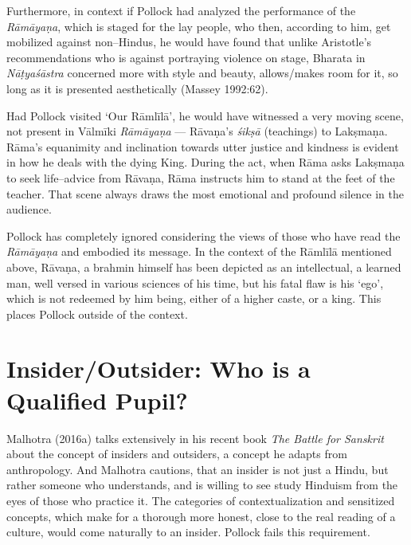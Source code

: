 Furthermore, in context if Pollock had analyzed the performance of the \textit{Rāmāyaṇa}, which is staged for the lay people, who then, according to him, get mobilized against non–Hindus, he would have found that unlike Aristotle’s recommendations who is against portraying violence on stage, Bharata in \textit{Nāṭyaśāstra} concerned more with style and beauty, allows/makes room for it, so long as it is presented aesthetically (Massey 1992:62).

Had Pollock visited ‘Our Rāmlīlā’, he would have witnessed a very moving scene, not present in Vālmīki \textit{Rāmāyaṇa} — Rāvaṇa’s \textit{śikṣā} (teachings) to Lakṣmaṇa. Rāma’s equanimity and inclination towards utter justice and kindness is evident in how he deals with the dying King. During the act, when Rāma asks Lakṣmaṇa to seek life–advice from Rāvaṇa, Rāma instructs him to stand at the feet of the teacher. That scene always draws the most emotional and profound silence in the audience.

Pollock has completely ignored considering the views of those who have read the \textit{Rāmāyaṇa} and embodied its message. In the context of the Rāmlīlā mentioned above, Rāvaṇa, a brahmin himself has been depicted as an intellectual, a learned man, well versed in various sciences of his time, but his fatal flaw is his ‘ego’, which is not redeemed by him being, either of a higher caste, or a king. This places Pollock outside of the context.


\section*{Insider/Outsider: Who is a Qualified Pupil?}

Malhotra (2016a) talks extensively in his recent book \textit{The Battle for Sanskrit} about the concept of insiders and outsiders, a concept he adapts from anthropology. And Malhotra cautions, that an insider is not just a Hindu, but rather someone who understands, and is willing to see study Hinduism from the eyes of those who practice it. The categories of contextualization and sensitized concepts, which make for a thorough more honest, close to the real reading of a culture, would come naturally to an insider. Pollock fails this requirement.

